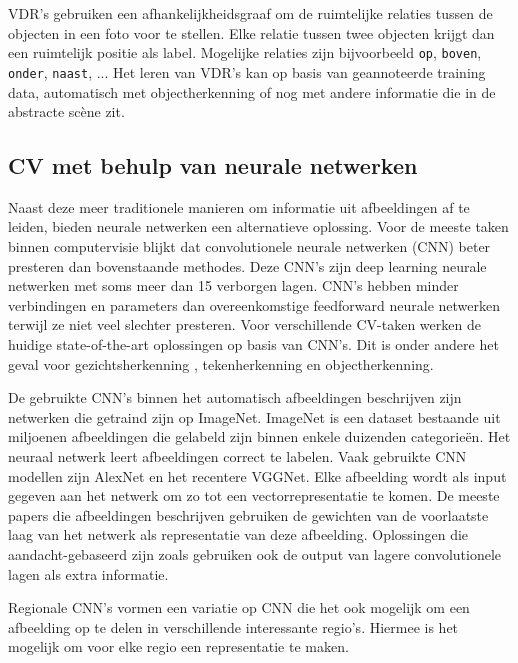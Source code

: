 VDR's gebruiken een afhankelijkheidsgraaf om de ruimtelijke relaties tussen de objecten in een foto voor te stellen. Elke relatie tussen twee objecten krijgt dan een ruimtelijk positie als label. Mogelijke relaties zijn bijvoorbeeld \texttt{op}, \texttt{boven}, \texttt{onder}, \texttt{naast}, ... Het leren van VDR's kan op basis van geannoteerde training data, automatisch met objectherkenning \cite{Elliott2015} of nog met andere informatie die in de abstracte sc\`ene zit. \cite{Gilberto2015} 

\subsection{CV met behulp van neurale netwerken}
Naast deze meer traditionele manieren om informatie uit afbeeldingen af te leiden, bieden neurale netwerken een alternatieve oplossing.
Voor de meeste taken binnen computervisie blijkt dat convolutionele neurale netwerken (CNN) beter presteren dan bovenstaande methodes. Deze CNN's zijn deep learning neurale netwerken met soms meer dan 15 verborgen lagen. CNN's hebben minder verbindingen en parameters dan overeenkomstige feedforward neurale netwerken terwijl ze niet veel slechter presteren.\cite{Krizhevsky2012a} 
Voor verschillende CV-taken werken de huidige state-of-the-art oplossingen op basis van CNN's. Dit is onder andere het geval voor gezichtsherkenning \cite{Zhou2015}, tekenherkenning \cite{Ciresan2012} en objectherkenning\cite{Szegedy2014}.

De gebruikte CNN's binnen het automatisch afbeeldingen beschrijven zijn netwerken die getraind zijn op ImageNet.\cite{Russakovsky2014} ImageNet is een dataset bestaande uit miljoenen afbeeldingen die gelabeld zijn binnen enkele duizenden categorie\"en. Het neuraal netwerk leert afbeeldingen correct te labelen. Vaak gebruikte CNN modellen zijn AlexNet\cite{Krizhevsky2012a} en het recentere VGGNet\cite{Arge2015}. Elke afbeelding wordt als input gegeven aan het netwerk om zo tot een vectorrepresentatie te komen. De meeste papers die afbeeldingen beschrijven gebruiken de gewichten van de voorlaatste laag van het netwerk als representatie van deze afbeelding\cite{Google,Mao2014a,Karpathy2015,Chen2014}. Oplossingen die aandacht-gebaseerd zijn zoals \cite{Xu2015,Jin2015} gebruiken ook de output van lagere convolutionele lagen als extra informatie.

Regionale CNN's vormen een variatie op CNN die het ook mogelijk om een afbeelding op te delen in verschillende interessante regio's. Hiermee is het mogelijk om voor elke regio een representatie te maken.\cite{Karpathy2015,Mitchell2015} 

